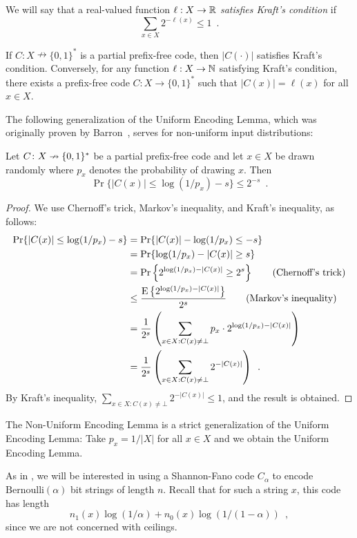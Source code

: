 \documentclass{patmorin}
\begin{document}
We will say that a real-valued function $\ell : X \to \mathbb{R}$
\emph{satisfies Kraft's condition} if
\[
  \sum_{x \in X} 2^{-\ell(x)} \leq 1 \enspace .
\]
\begin{lem}
  If $C : X \nrightarrow \{0,1\}^*$ is a partial prefix-free code,
  then $|C(\cdot)|$ satisfies Kraft's condition. Conversely, for any
  function $\ell : X \to \mathbb{N}$ satisfying Kraft's condition, there
  exists a prefix-free code $C : X \to \{0, 1\}^*$ such that
  $|C(x)| = \ell(x)$ for all $x \in X$.
\end{lem}

The following generalization of the Uniform Encoding Lemma, which was
originally proven by Barron~\cite[Theorem~3.1]{barron:dissertation},
serves for non-uniform input distributions:
\begin{lem}  
  Let $C\colon X\nrightarrow\{0,1\}^*$ be a partial prefix-free code
  and let $x\in X$ be drawn randomly where $p_x$ denotes the
  probability of drawing $x$.  Then
  \[
    \Pr\{ |C(x)| \le \log(1/p_x)-s\} \le 2^{-s} \enspace .
  \]
\end{lem}

\begin{proof}
  We use Chernoff's trick, Markov's inequality, and Kraft's
  inequality, as follows:
  \begin{align*}
    \Pr\{ |C(x)| \le\log(1/p_x)-s \}
    & = \Pr\{|C(x)| -\log(1/p_x) \le -s \} \\
    & = \Pr\{\log(1/p_x)-|C(x)| \ge s \} \\
    & = \Pr\left\{2^{\log(1/p_x)-|C(x)|} \ge 2^s \right\}  \tag{Chernoff's trick} \\
    & \le \frac{\operatorname{\mathrm{E}}\left\{2^{\log(1/p_x)-|C(x)|}\right\}}{2^s} \tag{Markov's inequality} \\
    & = \frac{1}{2^s} \left(\sum_{x\in X : C(x) \neq \bot} p_x\cdot 2^{\log(1/p_x)-|C(x)|}\right) \\
    & = \frac{1}{2^s} \left(\sum_{x\in X : C(x) \neq \bot }2^{-|C(x)|}\right) \enspace .
  \end{align*}
  By Kraft's inequality,
  $\sum_{x \in X : C(x) \neq \bot} 2^{-|C(x)|} \leq 1$, and the result
  is obtained.
\end{proof}

The Non-Uniform Encoding Lemma is a strict generalization
of the Uniform Encoding Lemma: Take $p_x=1/|X|$ for all $x\in X$ and
we obtain the Uniform Encoding Lemma.

As in , we will be interested in using a
Shannon-Fano code $C_\alpha$ to encode $\mathrm{Bernoulli}(\alpha)$
bit strings of length $n$. Recall that for such a string $x$, this
code has length
\[
  n_1(x) \log (1/\alpha) + n_0(x) \log(1/(1 - \alpha)) \enspace ,
\]
since we are not concerned with ceilings.
\end{document}
